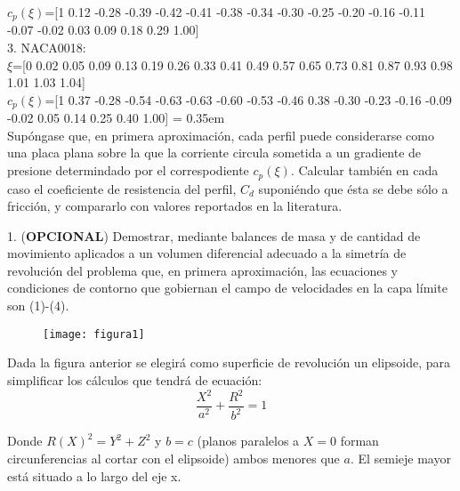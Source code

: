 \documentclass[11pt,a4paper]{article}
\begin{document}
$c_{p}(\xi)$=[1 0.12 -0.28 -0.39 -0.42 -0.41 -0.38 -0.34 -0.30 -0.25 -0.20 -0.16 -0.11 -0.07 -0.02 0.03 0.09 0.18 0.29 1.00]
\\

3. NACA0018:
\\

\hspace{1cm}
$\xi$=[0 0.02 0.05 0.09 0.13 0.19 0.26 0.33 0.41 0.49 0.57 0.65 0.73 0.81 0.87 0.93 0.98 1.01 1.03 1.04]
\\

$c_{p}(\xi)$=[1 0.37 -0.28 -0.54 -0.63 -0.63 -0.60 -0.53 -0.46 0.38 -0.30 -0.23 -0.16 -0.09 -0.02 0.05 0.14 0.25 0.40 1.00]
\font= 0.35em
\hspace{1cm}
\\

Supóngase que, en primera aproximación, cada perfil puede considerarse como una placa plana sobre la que la corriente circula sometida a un gradiente de presione determindado por el correspodiente $c_{p}(\xi)$. Calcular también en cada caso el coeficiente de resistencia del perfil, $C_{d}$ suponiéndo que ésta se debe sólo a fricción, y compararlo con valores reportados en la literatura.

\newpage

1. (\textbf {OPCIONAL}) Demostrar, mediante balances de masa y de cantidad de movimiento aplicados a un volumen diferencial adecuado a la simetría de revolución del problema que, en primera aproximación, las ecuaciones y condiciones de contorno que gobiernan el campo de velocidades en la capa límite son (1)-(4).
\vspace{1cm}

\begin{figure}[hb]
  \centering
  \texttt{[image: figura1]}
\end{figure}


Dada la figura anterior se elegirá como superficie de revolución un elipsoide, para simplificar los cálculos que tendrá de ecuación:
\[\frac{X^{2}}{a^2}+\frac{R^{2}}{b^2}=1\]



Donde $R(X)^{2} = Y^{2}+Z^{2}$ y $b = c$ (planos paralelos a $X=0$ forman circunferencias al cortar con el elipsoide) ambos menores que $a$. El semieje mayor está situado a lo largo del eje x.
\end{document}
